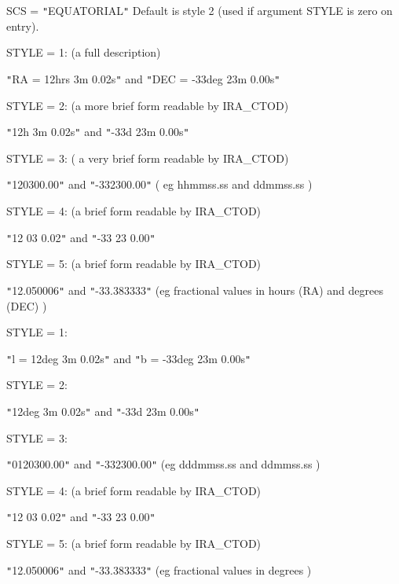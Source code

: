 {{{         \sstitem
         SCS = {\tt "}EQUATORIAL{\tt "}
           Default is style 2 (used if argument STYLE is zero on entry).

      }
         STYLE = 1:  (a full description)

            {\tt "}RA = 12hrs 3m 0.02s{\tt "} and  {\tt "}DEC = -33deg 23m 0.00s{\tt "}

         STYLE = 2:  (a more brief form readable by IRA\_CTOD)

            {\tt "}12h 3m 0.02s{\tt "} and {\tt "}-33d 23m 0.00s{\tt "}

         STYLE = 3:  ( a very brief form readable by IRA\_CTOD)

            {\tt "}120300.00{\tt "} and {\tt "}-332300.00{\tt "} ( eg hhmmss.ss and ddmmss.ss )

         STYLE = 4:  (a brief form readable by IRA\_CTOD)

            {\tt "}12 03 0.02{\tt "} and {\tt "}-33 23 0.00{\tt "}

         STYLE = 5:  (a brief form readable by IRA\_CTOD)

            {\tt "}12.050006{\tt "} and {\tt "}-33.383333{\tt "} (eg fractional values in
                                       hours (RA) and degrees (DEC) )

         STYLE = 1:

            {\tt "}l = 12deg 3m 0.02s{\tt "} and  {\tt "}b = -33deg 23m 0.00s{\tt "}

         STYLE = 2:

            {\tt "}12deg 3m 0.02s{\tt "} and {\tt "}-33d 23m 0.00s{\tt "}

         STYLE = 3:

            {\tt "}0120300.00{\tt "} and {\tt "}-332300.00{\tt "} (eg dddmmss.ss and ddmmss.ss )

         STYLE = 4:  (a brief form readable by IRA\_CTOD)

            {\tt "}12 03 0.02{\tt "} and {\tt "}-33 23 0.00{\tt "}

         STYLE = 5:  (a brief form readable by IRA\_CTOD)

            {\tt "}12.050006{\tt "} and {\tt "}-33.383333{\tt "} (eg fractional values in
                                         degrees )

}}
